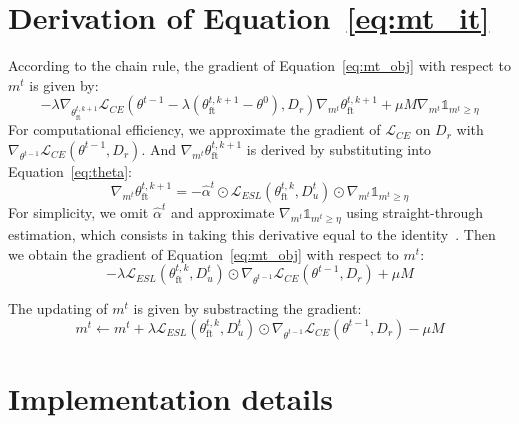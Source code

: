 \documentclass{article}
\theoremstyle{plain}
\theoremstyle{definition}
\theoremstyle{remark}
\begin{document}
\section{Derivation of Equation~\ref{eq:mt_it}}
\label{sec:derivation_eq_mt_it}
According to the chain rule, the gradient of Equation~\ref{eq:mt_obj} with respect to $m^t$ is given by:
\begin{equation}
    -\lambda\nabla_{\theta_\text{ft}^{t,k+1}}\mathcal{L}_{CE}(\theta^{t-1}-\lambda(\theta_{\text{ft}}^{t,k+1}-\theta^{0}), D_r)\nabla_{m^t}\theta_\text{ft}^{t,k+1}+\mu M\nabla_{m^t}\mathds{1}_{m^t\geq\eta}
\end{equation}
For computational efficiency, we approximate the gradient of $\mathcal{L}_{CE}$ on $D_r$ with $\nabla_{\theta^{t-1}}\mathcal{L}_{CE}(\theta^{t-1}, D_r)$. And $\nabla_{m^t}\theta_\text{ft}^{t,k+1}$ is derived by substituting into Equation~\ref{eq:theta}:
\begin{equation}
    \nabla_{m^t}\theta_\text{ft}^{t,k+1}=-\hat{\alpha}^t\odot\mathcal{L}_{ESL}(\theta_{\text{ft}}^{t,k}, D_u^t)\odot\nabla_{m^t}\mathds{1}_{m^t\geq\eta}
\end{equation}
For simplicity, we omit $\hat{\alpha}^t$ and approximate $\nabla_{m^t}\mathds{1}_{m^t\geq\eta}$ using straight-through estimation, which consists in taking this derivative equal to the identity~\cite{DBLP:conf/nips/OswaldZKSCZS21}. Then we obtain the gradient of Equation~\ref{eq:mt_obj} with respect to $m^t$:
\begin{equation}
    -\lambda\mathcal{L}_{ESL}(\theta_{\text{ft}}^{t,k}, D_u^t)\odot\nabla_{\theta^{t-1}}\mathcal{L}_{CE}(\theta^{t-1}, D_r)+\mu M
\end{equation}

The updating of $m^t$ is given by substracting the gradient:
\begin{equation}
    m^t\leftarrow m^t+\lambda\mathcal{L}_{ESL}(\theta_{\text{ft}}^{t,k}, D_u^t)\odot\nabla_{\theta^{t-1}}\mathcal{L}_{CE}(\theta^{t-1}, D_r)-\mu M
\end{equation}

\section{Implementation details}
\label{sec:implementation}
\end{document}
